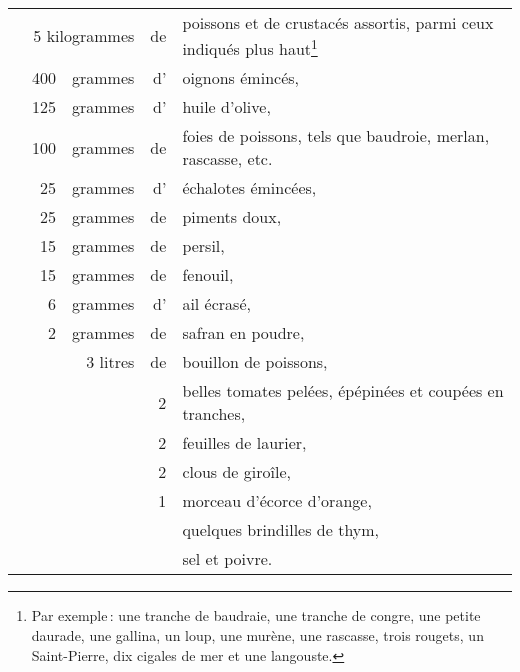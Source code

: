 \footnotesize
\begin{longtable}{rrrrp{16em}}   
  & \multicolumn{2}{r}{5 kilogrammes} & de &  poissons et de crustacés assortis, parmi ceux indiqués 
                              plus haut\footnote{Par exemple : une tranche de baudraie, une tranche 
                              de congre, une petite daurade, une gallina, un loup, une murène, une 
                              rascasse, trois rougets, un Saint-Pierre, dix cigales de mer et une 
                              langouste.}                                                                 \\
  & 400 & grammes     & d' & oignons émincés,                                                             \\
  & 125 & grammes     & d' & huile d'olive,                                                               \\
  & 100 & grammes     & de & foies de poissons, tels que baudroie, merlan, rascasse, etc.                 \\
  &  25 & grammes     & d' & échalotes émincées,                                                          \\
  &  25 & grammes     & de & piments doux,                                                                \\
  &  15 & grammes     & de & persil,                                                                      \\
  &  15 & grammes     & de & fenouil,                                                                     \\
  &   6 & grammes     & d' & ail écrasé,                                                                  \\
  &   2 & grammes     & de & safran en poudre,                                                            \\
  &     & 3 litres    & de & bouillon de poissons,                                                        \\
  &     &             &  2 & belles tomates pelées, épépinées et coupées en tranches,                     \\
  &     &             &  2 & feuilles de laurier,                                                         \\
  &     &             &  2 & clous de giroîle,                                                            \\
  &     &             &  1 & morceau d'écorce d'orange,                                                   \\
  &     &             &    & quelques brindilles de thym,                                                 \\
  &     &             &    & sel et poivre.                                                               \\
\end{longtable}
\normalsize 

